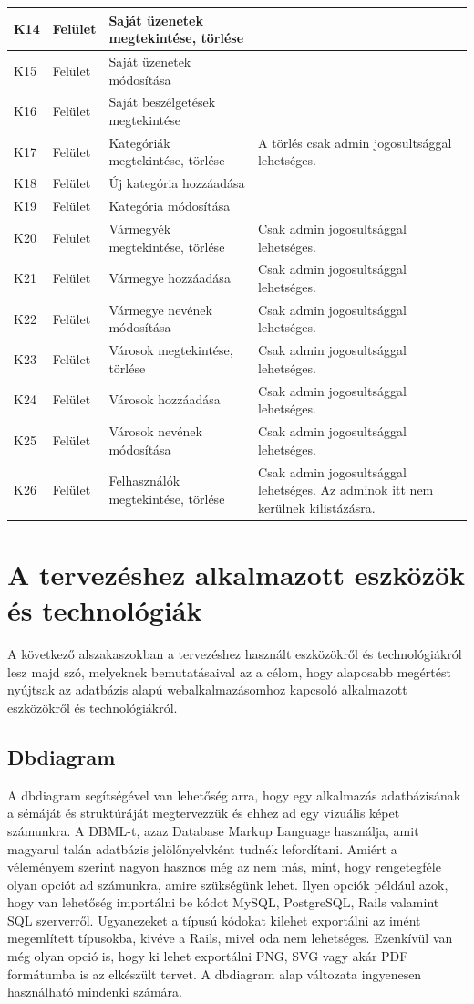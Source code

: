 \documentclass[]{thesis-ekf}
\theoremstyle{definition}
\theoremstyle{remark}
\begin{document}
\begin{longtable}{|l|l|p{3cm}|p{8cm}|}
			K14 & Felület & Saját üzenetek megtekintése, törlése & ~ \\ \hline
			K15 & Felület & Saját üzenetek módosítása & ~ \\ \hline
			K16 & Felület & Saját beszélgetések megtekintése & ~ \\ \hline
			K17 & Felület & Kategóriák megtekintése, törlése & A törlés csak admin jogosultsággal lehetséges. \\ \hline
			K18 & Felület & Új kategória hozzáadása & ~ \\ \hline
			K19 & Felület & Kategória módosítása & ~ \\ \hline
			K20 & Felület & Vármegyék megtekintése, törlése & Csak admin jogosultsággal lehetséges. \\ \hline
			K21 & Felület & Vármegye hozzáadása & Csak admin jogosultsággal lehetséges. \\ \hline
			K22 & Felület & Vármegye nevének módosítása & Csak admin jogosultsággal lehetséges. \\ \hline
			K23 & Felület & Városok megtekintése, törlése & Csak admin jogosultsággal lehetséges. \\ \hline
			K24 & Felület & Városok hozzáadása & Csak admin jogosultsággal lehetséges. \\ \hline
			K25 & Felület & Városok nevének módosítása & Csak admin jogosultsággal lehetséges. \\ \hline
			K26 & Felület & Felhasználók megtekintése, törlése & Csak admin jogosultsággal lehetséges. Az adminok itt nem kerülnek kilistázásra. \\ \hline
			
		\end{longtable}
		
	\section{A tervezéshez alkalmazott eszközök és technológiák}
		A következő alszakaszokban a tervezéshez használt eszközökről és technológiákról lesz majd szó, melyeknek bemutatásaival az a célom, hogy alaposabb megértést nyújtsak az adatbázis alapú webalkalmazásomhoz kapcsoló alkalmazott eszközökről és technológiákról.
	\subsection{Dbdiagram}
	A dbdiagram segítségével van lehetőség arra, hogy egy alkalmazás adatbázisának a sémáját és struktúráját megtervezzük és ehhez ad egy vizuális képet számunkra. A DBML-t, azaz Database Markup Language használja, amit magyarul talán adatbázis jelölőnyelvként tudnék lefordítani. Amiért a véleményem szerint nagyon hasznos még az nem más, mint, hogy rengetegféle olyan opciót ad számunkra, amire szükségünk lehet. Ilyen opciók például azok, hogy van lehetőség importálni be kódot MySQL, PostgreSQL, Rails valamint SQL szerverről. Ugyanezeket a típusú kódokat kilehet exportálni az imént megemlített típusokba, kivéve a Rails, mivel oda nem lehetséges. Ezenkívül van még olyan opció is, hogy ki lehet exportálni PNG, SVG vagy akár PDF formátumba is az elkészült tervet. A dbdiagram alap változata ingyenesen használható mindenki számára. \cite{Dbdiagram}
	
\end{document}
